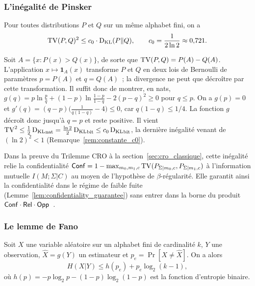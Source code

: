 \begin{sloppypar}
\subsubsection{L'in\'egalit\'e de Pinsker}
\label{subsubsec:pinsker_classique}

\begin{lemma}\label{lem:pinsker}
Pour toutes distributions $P$ et $Q$ sur un m\^eme alphabet fini, on a
\begin{equation}
\operatorname{TV}(P,Q)^2 \leq c_0 \cdot \operatorname{D_{\text{KL}}}(P \| Q),
\qquad c_0 = \frac{1}{2\ln 2} \approx 0{,}721.
\label{eq:pinsker}
\end{equation}
\end{lemma}

\begin{Preuve}
Soit $A = \{x : P(x) > Q(x)\}$, de sorte que $\operatorname{TV}(P,Q) = P(A) - Q(A)$. L'application
$x \mapsto \mathbf{1}_A(x)$ transforme $P$ et $Q$ en deux lois de Bernoulli de
param\`etres $p = P(A)$ et $q = Q(A)$~; la divergence ne peut que d\'ecro\^itre par
cette transformation. Il suffit donc de montrer, en nats,
$g(q) = p\ln\frac{p}{q} + (1-p)\ln\frac{1-p}{1-q} - 2(p-q)^2 \geq 0$ pour $q \leq p$.
On a $g(p) = 0$ et $g'(q) = (q-p)\bigl(\frac{1}{q(1-q)} - 4\bigr) \leq 0$, car
$q(1-q) \leq 1/4$. La fonction $g$ d\'ecro\^it donc jusqu'\`a $q = p$ et reste
positive. Il vient $\operatorname{TV}^2 \leq \tfrac12\operatorname{D_{\text{KL}}}_{\mathrm{nat}} = \tfrac{\ln 2}{2}\operatorname{D_{\text{KL}}}_{\mathrm{bit}}
\leq c_0\operatorname{D_{\text{KL}}}_{\mathrm{bit}}$, la derni\`ere in\'egalit\'e venant de $(\ln 2)^2 < 1$
(Remarque~\ref{rem:constante_c0}).
\end{Preuve}

\noindent Dans la preuve du Trilemme CRO \`a la section~\ref{sec:cro_classique}, cette in\'egalit\'e relie la
confidentialit\'e $\mathsf{Conf} = 1 - \max_{m_0,m_1,c} \operatorname{TV}(P_{\Sigma|m_0,c},
P_{\Sigma|m_1,c})$ \`a l'information mutuelle $I(M;\Sigma|C)$ au moyen de
l'hypoth\`ese de $\beta$-r\'egularit\'e. Elle garantit ainsi la confidentialit\'e
dans le r\'egime de faible fuite (Lemme~\ref{lem:confidentiality_guarantee})
sans entrer dans la borne du produit $\mathsf{Conf} \cdot \mathsf{Rel} \cdot
\mathsf{Opp}$~\cite{Tsybakov2009}.

\subsubsection{Le lemme de Fano}
\label{subsubsec:fano_classique}

\begin{lemma}\label{lem:fano}
Soit $X$ une variable al\'eatoire sur un alphabet fini de cardinalit\'e $k$, $Y$
une observation, $\hat{X} = g(Y)$ un estimateur et $p_e = \Pr[X \neq \hat{X}]$.
On a alors
\begin{equation}
H(X|Y) \leq h(p_e) + p_e \log_2(k-1),
\label{eq:fano_inequality}
\end{equation}
o\`u $h(p) = -p\log_2 p - (1-p)\log_2(1-p)$ est la fonction d'entropie
binaire.
\end{lemma}


\end{sloppypar}
